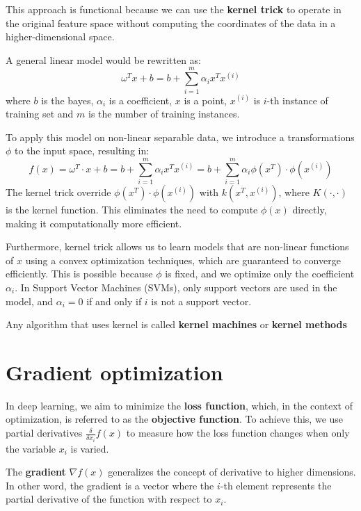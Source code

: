 This approach is functional because we can use the \textbf{kernel trick} to operate
in the original feature space without computing the coordinates of the data in a
higher-dimensional space.

A general linear model would be rewritten as:
\begin{equation}
    \omega^T x + b = b+ \sum_{i=1}^m \alpha_ix^Tx^{(i)}
\end{equation}
where $b$ is the bayes, $\alpha_i$ is a coefficient, $x$ is a point, $x^{(i)}$ is
$i$-th instance of training set and $m$ is the number of training instances.

To apply this model on non-linear separable data, we introduce a transformations
$\phi$ to the input space, resulting in:
\begin{equation}
    f(x) = \omega^T \cdot x + b = b + \sum_{i = 1}^m \alpha_ix^Tx^{(i)} = b +
    \sum_{i=1}^m \alpha_i\phi (x^T) \cdot \phi(x^{(i)})
\end{equation}
The kernel trick override $\phi(x^T) \cdot \phi(x^{(i)})$ with $k(x^T, x^{(i)})$,
where $K(\cdot , \cdot)$ is the kernel function. This eliminates the need to
compute $\phi(x)$ directly, making it computationally more efficient.

Furthermore, kernel trick allows us to learn models that are non-linear functions
of $x$ using a convex optimization techniques, which are guaranteed to converge
efficiently. This is possible because $\phi $ is fixed, and we optimize only the
coefficient $\alpha_i$. In Support Vector Machines (SVMs), only support vectors
are used in the model, and $\alpha_i= 0$ if and only if $i$ is not a support vector.

Any algorithm that uses kernel is called \textbf{kernel machines} or \textbf{kernel
    methods}
\section{Gradient optimization}
In deep learning, we aim to minimize the \textbf{loss function}, which, in the
context of optimization, is referred to as the \textbf{objective function}. To
achieve this, we use partial derivatives $\frac{\delta}{\delta x_i} f(x)$ to
measure how the loss function changes when only the variable $x_i$ is varied.

The \textbf{gradient} $\nabla f(x)$ generalizes the concept of derivative to
higher dimensions. In other word, the gradient is a vector where the $i$-th element
represents the partial derivative of the function with respect to $x_i$.

